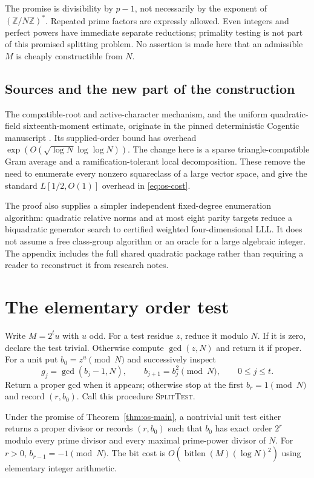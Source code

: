 The promise is divisibility by $p-1$, not necessarily by the exponent of
$(\mathbb Z/N\mathbb Z)^*$.  Repeated prime factors are expressly
allowed.  Even integers and perfect powers have immediate separate
reductions; primality testing is not part of this promised splitting
problem.  No assertion is made here that an admissible $M$ is cheaply
constructible from $N$.

\subsection{Sources and the new part of the construction}

The compatible-root and active-character mechanism, and the uniform
quadratic-field sixteenth-moment estimate, originate in the pinned
deterministic Cogentic manuscript \cite{CogDet2026}.  Its supplied-order
bound has overhead
$\exp(O(\sqrt{\log N}\log\log N))$.
The change here is a sparse triangle-compatible Gram average and a
ramification-tolerant local decomposition.  These remove the need to
enumerate every nonzero squareclass of a large vector space, and give
the standard $L[1/2,O(1)]$ overhead in \eqref{eq:os-cost}.

The proof also supplies a simpler independent fixed-degree enumeration
algorithm: quadratic relative norms and at most eight parity targets
reduce a biquadratic generator search to certified weighted
four-dimensional LLL.  It does not assume a free class-group algorithm
or an oracle for a large algebraic integer.
The appendix includes the full shared quadratic package rather than
requiring a reader to reconstruct it from research notes.

\section{The elementary order test}

Write $M=2^tu$ with $u$ odd.  For a test residue $z$, reduce it modulo
$N$.  If it is zero, declare the test trivial.  Otherwise compute
$\gcd(z,N)$ and return it if proper.  For a unit put
$b_0=z^u\pmod N$ and successively inspect
\[
 g_j=\gcd(b_j-1,N),\qquad b_{j+1}=b_j^2\pmod N,
 \qquad 0\leq j\leq t.
\]
Return a proper gcd when it appears; otherwise stop at the first
$b_r=1\pmod N$ and record $(r,b_0)$.
Call this procedure \textsc{SplitTest}.

\begin{lemma}
\label{lem:os-test}
Under the promise of Theorem~\ref{thm:os-main}, a nontrivial unit test
either returns a proper divisor or records $(r,b_0)$ such that $b_0$
has exact order $2^r$ modulo every prime divisor and every maximal
prime-power divisor of $N$.  For $r>0$, $b_{r-1}=-1\pmod N$.
The bit cost is $O(\operatorname{bitlen}(M)(\log N)^2)$ using elementary
integer arithmetic.
\end{lemma}

